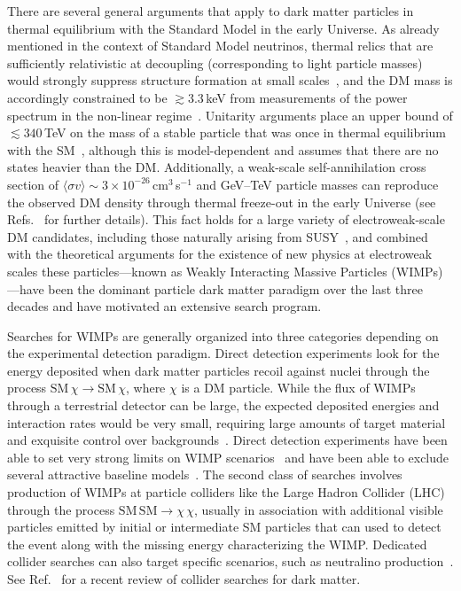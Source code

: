 There are several general arguments that apply to dark matter particles in thermal equilibrium with the Standard Model in the early Universe. As already mentioned in the context of Standard Model neutrinos, thermal relics that are sufficiently relativistic at decoupling (corresponding to light particle masses) would strongly suppress structure formation at small scales~\cite{Bringmann:2006mu}, and the DM mass is accordingly constrained to be $\gtrsim 3.3$\,keV from measurements of the power spectrum in the non-linear regime~\cite{Viel:2013apy}. Unitarity arguments place an upper bound of $\lesssim340$\,TeV on the mass of a stable particle that was once in thermal equilibrium with the SM~\cite{Griest:1989wd}, although this is model-dependent and assumes that there are no states heavier than the DM. Additionally, a weak-scale self-annihilation cross section of $\langle\sigma v\rangle\sim 3\times10^{-26}$\,cm$^3$\,s$^{-1}$ and GeV--TeV particle masses can reproduce the observed DM density through thermal freeze-out in the early Universe (see Refs.~\cite{1991NuPhB.360..145G,Jungman:1995df,Lisanti:2016jxe} for further details). This fact holds for a large variety of electroweak-scale DM candidates, including those naturally arising from SUSY~\cite{Bertone:2004pz,Jungman:1995df}, and combined with the theoretical arguments for the existence of new physics at electroweak scales these particles---known as Weakly Interacting Massive Particles (WIMPs)---have been the dominant particle dark matter paradigm over the last three decades and have motivated an extensive search program. 

Searches for WIMPs are generally organized into three categories depending on the experimental detection paradigm. Direct detection experiments look for the energy deposited when dark matter particles recoil against nuclei through the process $\text{SM}\,\chi\rightarrow\text{SM}\,\chi$, where $\chi$ is a DM particle. While the flux of WIMPs through a terrestrial detector can be large, the expected deposited energies and interaction rates would be very small, requiring large amounts of target material and exquisite control over backgrounds~\cite{Lisanti:2016jxe}. Direct detection experiments have been able to set very strong limits on WIMP scenarios~\cite{Aprile:2018dbl,Agnes:2018ves} and have been able to exclude several attractive baseline models~\cite{Escudero:2016gzx}. The second class of searches involves production of WIMPs at particle colliders like the Large Hadron Collider (LHC) through the process $\mathrm{SM}\,\mathrm{SM}\rightarrow\chi\,\chi$, usually in association with additional visible particles emitted by initial or intermediate SM particles that can used to detect the event along with the missing energy characterizing the WIMP. Dedicated collider searches can also target specific scenarios, such as neutralino production~\cite{Patrignani:2016xqp}. See Ref.~\cite{Kahlhoefer:2017dnp} for a recent review of collider searches for dark matter.


